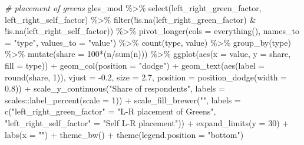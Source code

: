 \documentclass[
]{article}
\newenvironment{Shaded}{\begin{snugshade}}{\end{snugshade}}
\newcommand{\AttributeTok}[1]{\textcolor[rgb]{0.77,0.63,0.00}{#1}}
\newcommand{\CommentTok}[1]{\textcolor[rgb]{0.56,0.35,0.01}{\textit{#1}}}
\newcommand{\DecValTok}[1]{\textcolor[rgb]{0.00,0.00,0.81}{#1}}
\newcommand{\FloatTok}[1]{\textcolor[rgb]{0.00,0.00,0.81}{#1}}
\newcommand{\FunctionTok}[1]{\textcolor[rgb]{0.00,0.00,0.00}{#1}}
\newcommand{\NormalTok}[1]{#1}
\newcommand{\OtherTok}[1]{\textcolor[rgb]{0.56,0.35,0.01}{#1}}
\newcommand{\SpecialCharTok}[1]{\textcolor[rgb]{0.00,0.00,0.00}{#1}}
\newcommand{\StringTok}[1]{\textcolor[rgb]{0.31,0.60,0.02}{#1}}
\begin{document}
\begin{Shaded}
\begin{Highlighting}[]
\CommentTok{\# placement of greens }
\NormalTok{gles\_mod }\SpecialCharTok{\%\textgreater{}\%}
  \FunctionTok{select}\NormalTok{(left\_right\_green\_factor, left\_right\_self\_factor) }\SpecialCharTok{\%\textgreater{}\%}
  \FunctionTok{filter}\NormalTok{(}\SpecialCharTok{!}\FunctionTok{is.na}\NormalTok{(left\_right\_green\_factor) }\SpecialCharTok{\&} \SpecialCharTok{!}\FunctionTok{is.na}\NormalTok{(left\_right\_self\_factor)) }\SpecialCharTok{\%\textgreater{}\%}
  \FunctionTok{pivot\_longer}\NormalTok{(}\AttributeTok{cols =} \FunctionTok{everything}\NormalTok{(), }\AttributeTok{names\_to =} \StringTok{"type"}\NormalTok{, }\AttributeTok{values\_to =} \StringTok{"value"}\NormalTok{) }\SpecialCharTok{\%\textgreater{}\%}
  \FunctionTok{count}\NormalTok{(type, value) }\SpecialCharTok{\%\textgreater{}\%}
  \FunctionTok{group\_by}\NormalTok{(type) }\SpecialCharTok{\%\textgreater{}\%}
  \FunctionTok{mutate}\NormalTok{(}\AttributeTok{share =} \DecValTok{100}\SpecialCharTok{*}\NormalTok{(n}\SpecialCharTok{/}\FunctionTok{sum}\NormalTok{(n))) }\SpecialCharTok{\%\textgreater{}\%}
  \FunctionTok{ggplot}\NormalTok{(}\FunctionTok{aes}\NormalTok{(}\AttributeTok{x =}\NormalTok{ value, }\AttributeTok{y =}\NormalTok{ share, }\AttributeTok{fill =}\NormalTok{ type)) }\SpecialCharTok{+}
  \FunctionTok{geom\_col}\NormalTok{(}\AttributeTok{position =} \StringTok{"dodge"}\NormalTok{) }\SpecialCharTok{+}
  \FunctionTok{geom\_text}\NormalTok{(}\FunctionTok{aes}\NormalTok{(}\AttributeTok{label =} \FunctionTok{round}\NormalTok{(share, }\DecValTok{1}\NormalTok{)), }\AttributeTok{vjust =} \SpecialCharTok{{-}}\FloatTok{0.2}\NormalTok{, }\AttributeTok{size =} \FloatTok{2.7}\NormalTok{,}
            \AttributeTok{position =} \FunctionTok{position\_dodge}\NormalTok{(}\AttributeTok{width =} \FloatTok{0.8}\NormalTok{)) }\SpecialCharTok{+}
  \FunctionTok{scale\_y\_continuous}\NormalTok{(}\StringTok{"Share of respondents"}\NormalTok{, }\AttributeTok{labels =}\NormalTok{ scales}\SpecialCharTok{::}\FunctionTok{label\_percent}\NormalTok{(}\AttributeTok{scale =} \DecValTok{1}\NormalTok{)) }\SpecialCharTok{+}
  \FunctionTok{scale\_fill\_brewer}\NormalTok{(}\StringTok{""}\NormalTok{, }
                    \AttributeTok{labels =} \FunctionTok{c}\NormalTok{(}\StringTok{"left\_right\_green\_factor"} \OtherTok{=} \StringTok{"L{-}R placement of Greens"}\NormalTok{, }
                               \StringTok{"left\_right\_self\_factor"} \OtherTok{=} \StringTok{"Self L{-}R placement"}\NormalTok{)) }\SpecialCharTok{+}
  \FunctionTok{expand\_limits}\NormalTok{(}\AttributeTok{y =} \DecValTok{30}\NormalTok{) }\SpecialCharTok{+}
  \FunctionTok{labs}\NormalTok{(}\AttributeTok{x =} \StringTok{""}\NormalTok{) }\SpecialCharTok{+}
  \FunctionTok{theme\_bw}\NormalTok{() }\SpecialCharTok{+}
  \FunctionTok{theme}\NormalTok{(}\AttributeTok{legend.position =} \StringTok{"bottom"}\NormalTok{)}
\end{Highlighting}
\end{Shaded}
\end{document}

